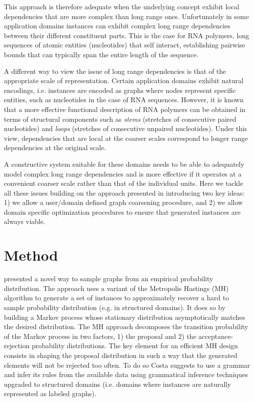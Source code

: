 \documentclass{article}
\begin{document}
This approach is therefore adequate when the underlying concept exhibit local
dependencies that are more complex than long range ones.  Unfortunately in
some application domains instances can exhibit complex long range dependencies
between their different constituent parts. This is the case for RNA polymers,
long sequences of atomic entities (nucleotides) that self interact,
establishing pairwise bounds that can typically span the entire length of the
sequence.

A different way to view the issue of long range dependencies is that of the
appropriate scale of representation. Certain application domains exhibit
natural encodings, i.e. instances are encoded as graphs where nodes represent
specific entities, such as nucleotides in the case of RNA sequences. However,
it is known that a more effective functional description of RNA polymers can
be obtained in terms of structural components such as {\em stems} (stretches
of consecutive paired nucleotides) and {\em loops} (stretches of consecutive
unpaired nucleotides). Under this view, dependencies that are local at the
coarser scales correspond to longer range dependencies at the original scale.

A constructive system suitable for these domains needs to be able to
adequately model complex long range dependencies and is more effective if it
operates at a convenient coarser scale rather than that of the individual
units. Here we tackle all these issues building on the approach presented in
\cite{costa16} introducing two key ideas: 1) we allow a user/domain defined graph
coarsening procedure,
and 2) we allow domain specific optimization procedures to ensure that
generated instances are always viable.


\section{Method}

 


\cite{costa16} presented a novel way to sample graphs from an empirical
probability distribution. The approach uses a variant of the Metropolis
Hastings (MH) algorithm to generate a set of instances to approximately
recover a hard to sample probability distribution (e.g. in structured
domains). It does so by building a Markov process whose stationary
distribution asymptotically matches the desired distribution. The MH approach
decomposes the transition probability of the Markov process in two factors, 1)
the proposal  and 2) the acceptance-rejection  probability distributions. The
key element for an efficient MH design consists in shaping the proposal
distribution  in such a way that the generated elements will not be rejected
too often. To do so Costa suggests to use a grammar and infer its rules from
the available data using grammatical inference techniques upgraded to
structured domains (i.e. domains where instances are naturally represented as
labeled graphs).
\end{document}
